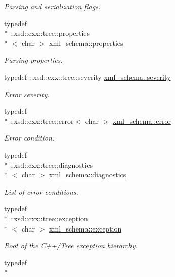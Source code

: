 \begin{DoxyCompactItemize}
\begin{DoxyCompactList}\small\item\em Parsing and serialization flags. \end{DoxyCompactList}\item 
typedef \\*
\-::xsd\-::cxx\-::tree\-::properties\\*
$<$ char $>$ \hyperlink{namespacexml__schema_a1a8ebac679580b41baebd62c7d641c1d}{xml\-\_\-schema\-::properties}
\begin{DoxyCompactList}\small\item\em Parsing properties. \end{DoxyCompactList}\item 
typedef \-::xsd\-::cxx\-::tree\-::severity \hyperlink{namespacexml__schema_a7d2d246dda9239f18f1866a1cdb4022e}{xml\-\_\-schema\-::severity}
\begin{DoxyCompactList}\small\item\em Error severity. \end{DoxyCompactList}\item 
typedef \\*
\-::xsd\-::cxx\-::tree\-::error$<$ char $>$ \hyperlink{namespacexml__schema_a25204746dcf5a00a92e68d214a894b84}{xml\-\_\-schema\-::error}
\begin{DoxyCompactList}\small\item\em Error condition. \end{DoxyCompactList}\item 
typedef \\*
\-::xsd\-::cxx\-::tree\-::diagnostics\\*
$<$ char $>$ \hyperlink{namespacexml__schema_a0d9a5a38c30964872464e338625301d8}{xml\-\_\-schema\-::diagnostics}
\begin{DoxyCompactList}\small\item\em List of error conditions. \end{DoxyCompactList}\item 
typedef \\*
\-::xsd\-::cxx\-::tree\-::exception\\*
$<$ char $>$ \hyperlink{namespacexml__schema_a1e9265f27587f794fe1b02f5cefb447f}{xml\-\_\-schema\-::exception}
\begin{DoxyCompactList}\small\item\em Root of the C++/\-Tree exception hierarchy. \end{DoxyCompactList}\item 
typedef \\*

\end{DoxyCompactItemize}
